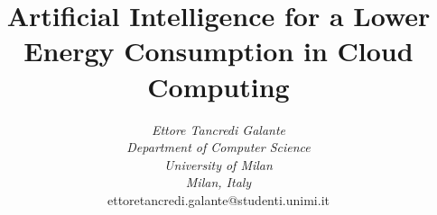 \documentclass{article}
\begin{document}
\title{Artificial Intelligence for a Lower Energy Consumption in Cloud Computing}

\author{
\textit{Ettore Tancredi Galante} \\
\textit{Department of Computer Science} \\
\textit{University of Milan} \\
\textit{Milan, Italy} \\
ettoretancredi.galante@studenti.unimi.it
}


\maketitle
\newpage
\tableofcontents
\newpage










%
%
%
%



\end{document}
